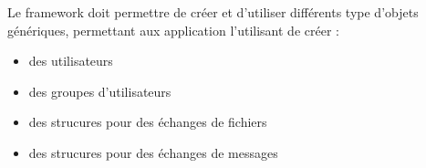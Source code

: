 Le framework doit permettre de créer et d'utiliser différents type d'objets génériques, permettant aux application l'utilisant de créer :

\begin{itemize}
\item{des utilisateurs}
\item{des groupes d'utilisateurs}
\item{des strucures pour des échanges de fichiers}
\item{des strucures pour des échanges de messages}
\end{itemize}

